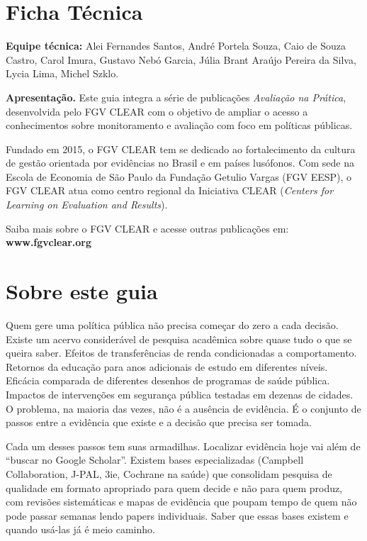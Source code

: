 \documentclass[12pt, a4paper, openany]{book}
\begin{document}
\thispagestyle{empty}
\section*{Ficha Técnica}

\textbf{Equipe técnica:} Alei Fernandes Santos, André Portela Souza, Caio de Souza Castro, Carol Imura, Gustavo Nebó Garcia, Júlia Brant Araújo Pereira da Silva, Lycia Lima, Michel Szklo.

\vspace{1cm}

\noindent\textbf{Apresentação.} Este guia integra a série de publicações
\textit{Avaliação na Prática}, desenvolvida pelo FGV CLEAR com o objetivo de
ampliar o acesso a conhecimentos sobre monitoramento e avaliação com foco em
políticas públicas.

Fundado em 2015, o FGV CLEAR tem se dedicado ao fortalecimento da cultura de
gestão orientada por evidências no Brasil e em países lusófonos. Com sede na
Escola de Economia de São Paulo da Fundação Getulio Vargas (FGV EESP), o FGV
CLEAR atua como centro regional da Iniciativa CLEAR (\textit{Centers for
Learning on Evaluation and Results}).

Saiba mais sobre o FGV CLEAR e acesse outras publicações em:
\textbf{www.fgvclear.org}

\newpage

\thispagestyle{empty}
\section*{Sobre este guia}
Quem gere uma política pública não precisa começar do zero a cada
decisão. Existe um acervo considerável de pesquisa acadêmica sobre quase
tudo o que se queira saber. Efeitos de transferências de renda
condicionadas a comportamento. Retornos da educação para anos adicionais
de estudo em diferentes níveis. Eficácia comparada de diferentes desenhos
de programas de saúde pública. Impactos de intervenções em segurança
pública testadas em dezenas de cidades. O problema, na maioria das vezes,
não é a ausência de evidência. É o conjunto de passos entre a evidência
que existe e a decisão que precisa ser tomada.

Cada um desses passos tem suas armadilhas. Localizar evidência hoje vai
além de ``buscar no Google Scholar''. Existem bases especializadas
(Campbell Collaboration, J-PAL, 3ie, Cochrane na saúde) que consolidam
pesquisa de qualidade em formato apropriado para quem decide e não para
quem produz, com revisões sistemáticas e mapas de evidência que poupam
tempo de quem não pode passar semanas lendo papers individuais. Saber que
essas bases existem e quando usá-las já é meio caminho.
\end{document}
